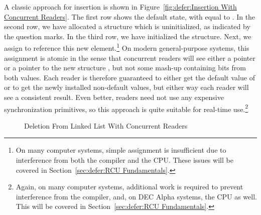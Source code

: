 A classic approach for insertion is shown in
Figure~\ref{fig:defer:Insertion With Concurrent Readers}.
The first row shows the default state, with  equal to .
In the second row, we have allocated a structure which is uninitialized,
as indicated by the question marks.
In the third row, we have initialized the structure.
Next, we assign  to reference this new element.\footnote{
	On many computer systems, simple assignment is insufficient
	due to interference from both the compiler and the CPU.
	These issues will be covered in
	Section~\ref{sec:defer:RCU Fundamentals}.}
On modern general-purpose systems, this assignment is atomic in the
sense that concurrent readers will see either a  pointer
or a pointer to the new structure , but not some mash-up
containing bits from both values.
Each reader is therefore guaranteed to either get the
default value of  or to get the newly installed
non-default values, but either way each reader will see
a consistent result.
Even better, readers need not use any expensive synchronization
primitives, so this approach is quite suitable for real-time use.\footnote{
	Again, on many computer systems, additional work is required
	to prevent interference from the compiler, and, on DEC Alpha
	systems, the CPU as well.
	This will be covered in
	Section~\ref{sec:defer:RCU Fundamentals}.}

\begin{figure}[tb]
\begin{center}
\end{center}
\caption{Deletion From Linked List With Concurrent Readers}
\label{fig:defer:Deletion From Linked List With Concurrent Readers}
\end{figure}

